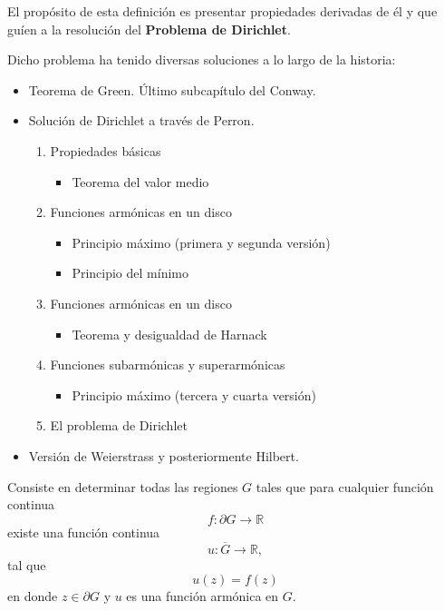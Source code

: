 El propósito de esta definición es presentar propiedades derivadas de él y que guíen a la resolución del \textbf{Problema de Dirichlet}. \bigbreak 


Dicho problema ha tenido diversas soluciones a lo largo de la historia:
\begin{itemize}
    \item Teorema de Green. Último subcapítulo del Conway. 
    \item Solución de Dirichlet a través de Perron. 
    \begin{enumerate}
        \item Propiedades básicas
        \begin{itemize}
            \item Teorema del valor medio
        \end{itemize}
        \item Funciones armónicas en un disco
            \begin{itemize}
                \item Principio máximo (primera y segunda versión)
                \item Principio del mínimo
            \end{itemize}
        \item Funciones armónicas en un disco
            \begin{itemize}
                \item Teorema y desigualdad de Harnack 
            \end{itemize}
        \item Funciones subarmónicas y superarmónicas
        \begin{itemize}
            \item Principio máximo (tercera y cuarta versión)
        \end{itemize}
        \item El problema de Dirichlet
    \end{enumerate}
    \item Versión de Weierstrass y posteriormente Hilbert. 
\end{itemize}



\begin{cajita}
    \begin{definicion}
        Consiste en determinar todas las regiones $G$ tales que para cualquier función continua
        $$f:\partial G\to \mathbb{R}$$
        existe una función continua
        $$u:\overline{G}\to \mathbb{R},$$
        tal que 
        $$u(z)=f(z)$$
        en donde $z\in\partial G$ y $u$ es una función armónica en $G$.
    \end{definicion}
\end{cajita}


